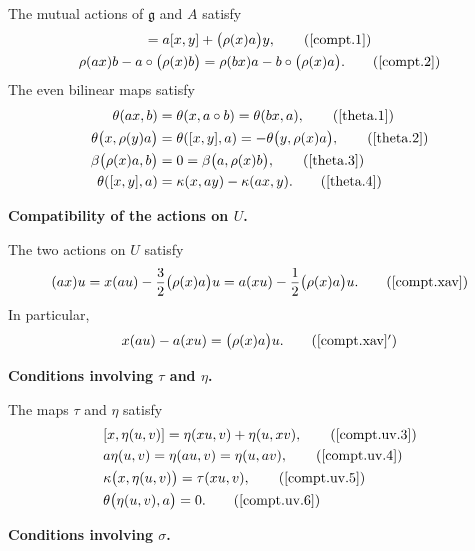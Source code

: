 \documentclass[12pt]{article}
\numberwithin{equation}{section}
\theoremstyle{definition}
\theoremstyle{plain}
\newcommand{\fg}{\mathfrak{g}}
\begin{document}
The mutual actions of $\fg$ and $A$ satisfy
\begin{gather}
    [x,ay]=a[x,y]+\big(\rho(x)a\big)y,\tag{\ref{compt.1}}\\
    \rho(ax)b-a\circ\big(\rho(x)b\big)=\rho(bx)a-b\circ\big(\rho(x)a\big).\tag{\ref{compt.2}}
\end{gather}
The even bilinear maps satisfy
\begin{align}
    \theta(ax,b)&=\theta(x,a\circ b)=\theta(bx,a),\tag{\ref{theta.1}}\\
    \theta\big(x,\rho(y)a\big)&=\theta([x,y],a)=-\theta\big(y,\rho(x)a\big),\tag{\ref{theta.2}}\\
    \beta\big(\rho(x)a,b\big)&=0=\beta\big(a,\rho(x)b\big),\tag{\ref{theta.3}}\\
    \theta([x,y],a)&=\kappa(x,ay)-\kappa(ax,y).\tag{\ref{theta.4}}
\end{align}

\medskip
\noindent\textbf{Compatibility of the actions on $U$.}

The two actions on $U$ satisfy
\begin{equation}
    (ax)u=x(au)-\frac32\big(\rho(x)a\big)u=a(xu)-\frac12\big(\rho(x)a\big)u.\tag{\ref{compt.xav}}
\end{equation}
In particular,
\begin{equation}\label{compt.xav.prime}
    x(au)-a(xu)=\big(\rho(x)a\big)u.\tag{\ref{compt.xav}$'$}
\end{equation}

\medskip
\noindent\textbf{Conditions involving $\tau$ and $\eta$.}

The maps $\tau$ and $\eta$ satisfy
\begin{align}
    &[x,\eta(u,v)]=\eta(xu,v)+\eta(u,xv),\tag{\ref{compt.uv.3}}\\
    &a\eta(u,v)=\eta(au,v)=\eta(u,av),\tag{\ref{compt.uv.4}}\\
    &\kappa\big(x,\eta(u,v)\big)=\tau(xu,v),\tag{\ref{compt.uv.5}}\\
    &\theta\big(\eta(u,v),a\big)=0.\tag{\ref{compt.uv.6}}
\end{align}

\medskip
\noindent\textbf{Conditions involving $\sigma$.}
\end{document}
